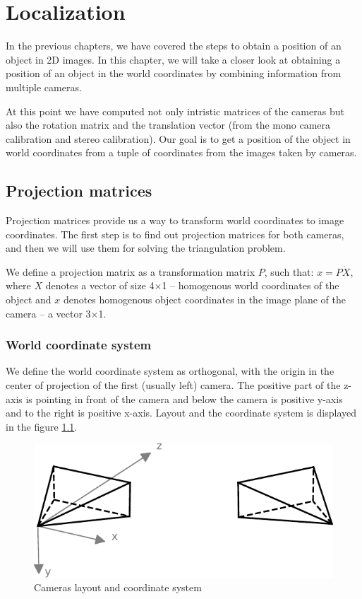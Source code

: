 \chapter{Localization}

In the previous chapters, we have covered the steps to obtain a position of
an object in 2D images. In this chapter, we will take a closer look at
obtaining a position of an object in the world coordinates by combining
information from multiple cameras.

At this point we have computed not only intristic matrices of the cameras but
also the rotation matrix and the translation vector (from the mono camera
calibration and stereo calibration). Our goal is to get a position of the
object in world coordinates from a tuple of coordinates from the images taken by
cameras.

\section{Projection matrices}
Projection matrices provide us a way to transform world coordinates to image
coordinates. The first step is to find out projection matrices for both
cameras, and then we will use them for solving the triangulation problem.

We define a projection matrix as a transformation matrix $P$, such that: $x = P
\dot X$, where $X$ denotes a vector of size 4$\times$1 -- homogenous world coordinates
of the object and $x$ denotes homogenous object coordinates in the image plane
of the camera -- a vector 3$\times$1.

\subsection{World coordinate system}
We define the world coordinate system as orthogonal, with the origin in the
center of projection of the first (usually left) camera. The positive part of
the z-axis is pointing in front of the camera and below the camera is positive
y-axis and to the right is positive x-axis. Layout and the coordinate system is
displayed in the figure \ref{fig:coordinate-system}.

\begin{figure}
\centering
\includegraphics{img/camera-positions}
\caption{Cameras layout and coordinate system}
\label{fig:coordinate-system}
\end{figure}

